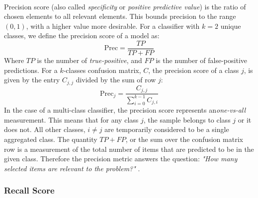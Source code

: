 \documentclass[12pt,letterpaper]{article}
\begin{document}
\paragraph*{}Precision score (also called \textit{specificity} or \textit{positive predictive value}) is the ratio of chosen elements to all relevant elements. This bounds precision to the range $(0,1)$, with a higher value more desirable. For a classifier with $k = 2$ unique classes, we define the precision score of a model as:
\begin{equation}
\label{eqn-BinaryPrecision}
\text{Prec} = \frac{TP}{TP + FP}
\end{equation}
Where $TP$ is the number of \textit{true-positive}, and $FP$ is the number of false-positive predictions. For a $k$-classes confusion matrix, $C$, the precision score of a class $j$, is given by the entry $C_{j,j}$ divided by the sum of row $j$:
\begin{equation}
\label{eqn-KPrecision}
\text{Prec}_j = \frac{C_{j,j}}{\sum_{i=0}^{k-1}C_{j,i}}
\end{equation}
In the case of a multi-class classifier, the precision score represents an\textit{one-vs-all} measurement. This means that for any class $j$, the sample belongs to class $j$ or it does not. All other classes, $i \neq j$ are temporarily considered to be a single aggregated class. The quantity $TP + FP$, or the sum over the confusion matrix row is a measurement of the total number of items that are predicted to be in the given class. Therefore the precision metric answers the question: \textit{"How many selected items are relevant to the problem?"} \cite{Geron,James}.


\subsubsection{Recall Score}
\end{document}
